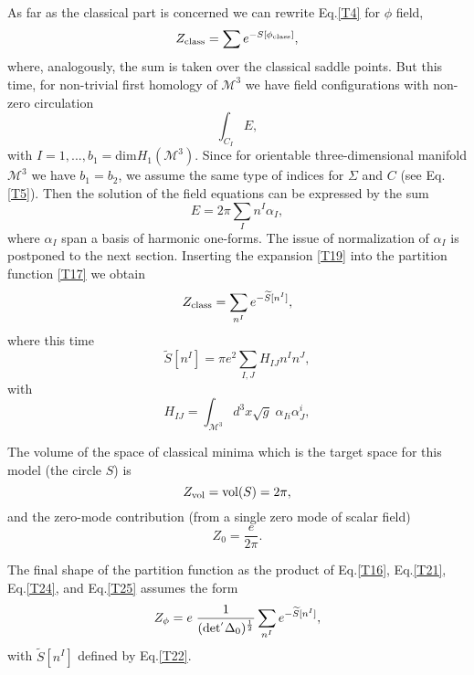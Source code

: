\documentclass[a4paper,12pt]{article}
\begin{document}
As far as the classical part is concerned we can rewrite Eq.\eqref{T4} for $\phi$ field,
\begin{equation}\label{T17}
Z_{\rm class}=\sum e^{-S[\phi_{\rm class}]},
\end{equation}
where, analogously, the sum is taken over the classical saddle points.
But this time, for non-trivial first homology of $\mathcal{M}^{3}$ we have field configurations
with non-zero circulation
\begin{equation}\label{T18}
\int_{C_{I}} E,
\end{equation}
with $I=1,...,b_{1}=$dim$H_{1}(\mathcal{M}^{3})$. Since for
orientable three-dimensional manifold $\mathcal{M}^{3}$ we have
$b_{1}=b_{2}$, we assume the same type of indices for $\Sigma$ and
$C$ (see Eq.\eqref{T5}). Then the solution of the field equations
can be expressed by the sum
\begin{equation}\label{T19}
E=2\pi\sum_{I} n^{I}\alpha_{I},
\end{equation}
where $\alpha_{I}$  span a basis of harmonic
one-forms. The issue of normalization of $\alpha_{I}$ is postponed to the next section.
Inserting the expansion \eqref{T19} into the partition function
\eqref{T17} we obtain
\begin{equation}\label{T21}
Z_{\rm class}=\sum_{n^{I}} e^{-\widetilde{S}[n^{ I }]},
\end{equation}
where this time
\begin{equation}\label{T22}
\widetilde{S} [n^{I}] = \pi e^{2} \sum_{I,J} H_{IJ} n^{I}n^{J},
\end{equation}
with
\begin{equation}\label{T23}
H_{IJ}=\int_{\mathcal{M}^{3}} d^{3}x
\sqrt{g} \; \alpha_{Ii}\alpha_{J}^{i},
\end{equation}

The volume of the space of classical minima which is the target
space for this model (the circle $S$) is
\begin{equation}\label{T24}
Z_{\rm vol}={\rm vol} (S) = 2\pi,
\end{equation}
and the zero-mode contribution (from a single zero mode of scalar field)
\begin{equation}\label{T25}
Z_{0}=\frac{e}{2\pi}.
\end{equation}

The final shape of the partition function as the product of
Eq.\eqref{T16}, Eq.\eqref{T21}, Eq.\eqref{T24}, and Eq.\eqref{T25}
assumes the form
\begin{equation}\label{T26}
Z_{\phi}=e \; \frac{1}{ (\rm det^{'}\Delta_{0})^{ \frac{1}{2} }}
\sum_{n^{I} } e^{-\widetilde{S}[n^{I}]},
\end{equation}
with $\widetilde{S}[n^{I}]$ defined by Eq.\eqref{T22}.
\end{document}
